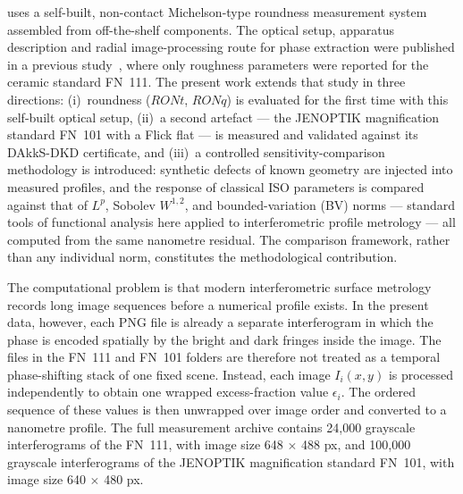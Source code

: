 \documentclass[review]{elsarticle}
\providecommand{\DIFaddtex}[1]{{\protect\color{blue}\uwave{#1}}} %
\providecommand{\DIFaddend}{} %
\providecommand{\DIFadd}[1]{\texorpdfstring{\DIFaddtex{#1}}{#1}} %
\DeclareRobustCommand{\DIFaddend}{\DIFOaddend \let\includegraphics\DIFOincludegraphics} %
\begin{document}
\DIFadd{The present work }\DIFaddend uses a self-built, non-contact Michelson-type roundness measurement system assembled from off-the-shelf components. The optical setup, apparatus description and radial image-processing route for phase extraction were published in a previous study~\cite{kucharski2025radial-0ca}, where only roughness parameters were reported for the ceramic standard FN~111. The present work extends that study in three directions: (i)~roundness ($RONt$, $RONq$) is evaluated for the first time with this self-built optical setup, (ii)~a second artefact — the JENOPTIK magnification standard FN~101 with a Flick flat — is measured and validated against its DAkkS-DKD certificate, and (iii)~a controlled sensitivity-comparison methodology is introduced: synthetic defects of known geometry are injected into measured profiles, and the response of classical ISO parameters is compared against that of $L^p$, Sobolev $W^{1,2}$, and bounded-variation (BV) norms — standard tools of functional analysis here applied to interferometric profile metrology — all computed from the same nanometre residual. The comparison framework, rather than any individual norm, constitutes the methodological contribution.

The computational problem is that modern interferometric surface metrology records long image sequences before a numerical profile exists. In the present data, however, each PNG file is already a separate interferogram in which the phase is encoded spatially by the bright and dark fringes inside the image. The files in the FN~111 and FN~101 folders are therefore not treated as a temporal phase-shifting stack of one fixed scene. Instead, each image $I_i(x,y)$ is processed independently to obtain one wrapped excess-fraction value $\epsilon_i$. The ordered sequence of these values is then unwrapped over image order and converted to a nanometre profile. The full measurement archive contains 24,000 grayscale interferograms of the FN~111, with image size 648 $\times$ 488 px, and 100,000 grayscale interferograms of the JENOPTIK magnification standard FN~101, with image size 640 $\times$ 480 px.
\end{document}
